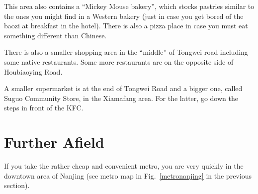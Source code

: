\documentclass[11pt]{report}
\begin{document}
\begin{itemize}
\noindent This area also contains a ``Mickey Mouse bakery'',
which stocks pastries similar to the ones you might find in a 
Western bakery (just in case you get bored of the baozi
at breakfast in the hotel). There is also a pizza place in 
case you must eat something different than Chinese. 

There is also a smaller shopping area in the ``middle'' of
Tongwei road including some native restaurants. Some more
restaurants are on the opposite side of Houbiao\-ying Road. 

A smaller supermarket is at the end of Tongwei Road and a
bigger one, called Suguo Community Store, in the Xiamafang
area. For the latter, go down the steps in front of the KFC.
\end{itemize}

\section{Further Afield}

If you take the rather cheap and convenient metro, you are 
very quickly in the downtown area of Nanjing (see metro map in
Fig.~\ref{metronanjing} in the previous section). 
\end{document}
